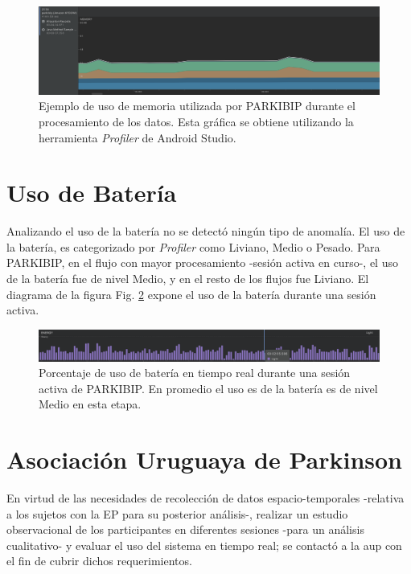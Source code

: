 \begin{figure}[H]
\centering
\includegraphics[width=\textwidth]{TESIS/imagenes/chap06/memory-usage.png}
\caption{Ejemplo de uso de memoria utilizada por PARKIBIP durante el procesamiento de los datos. Esta gráfica se obtiene utilizando la herramienta \textit{Profiler} de Android Studio.}
\label{FIG:memory-usage}
\end{figure}

\section*{Uso de Batería}

Analizando el uso de la batería no se detectó ningún tipo de anomalía. El uso de la batería, es categorizado por \textit{Profiler} como Liviano, Medio o Pesado. Para PARKIBIP, en el flujo con mayor procesamiento -sesión activa en curso-, el uso de la batería fue de nivel Medio, y en el resto de los flujos fue Liviano. El diagrama de la figura Fig. \ref{FIG:battery-usage} expone el uso de la batería durante una sesión activa.

\begin{figure}[H]
\hspace{-2.0cm}
\includegraphics[clip,width=1.3 \columnwidth]{TESIS/imagenes/chap06/battery-usage.png}
\caption{Porcentaje de uso de batería en tiempo real durante una sesión activa de PARKIBIP. En promedio el uso es de la batería es de nivel Medio en esta etapa.}
\label{FIG:battery-usage}
\end{figure}

\section{Asociación Uruguaya de Parkinson}

En virtud de las necesidades de recolección de datos espacio-temporales -relativa a los sujetos con la EP para su posterior análisis-, realizar un estudio observacional de los participantes en diferentes sesiones -para un análisis cualitativo- y evaluar el uso del sistema en tiempo real; se contactó a la \gls{aup} con el fin de cubrir dichos requerimientos.

